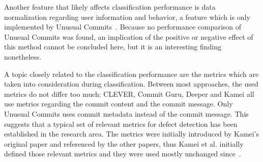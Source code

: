 Another feature that likely affects classification performance is data normalization regarding user information and behavior, a feature which is only implemented by Unusual Commits~\cite{Goyal2017}.
Because no performance comparison of Unusual Commits was found, an implication of the positive or negative effect of this method cannot be concluded here, but it is an interesting finding nonetheless.

A topic closely related to the classification performance are the metrics which are taken into consideration during classification. Between most approaches, the used metrics do not differ too much: CLEVER, Commit Guru, Deeper and Kamei all use metrics regarding the commit content and the commit message. Only Unusual Commits uses commit metadata instead of the commit message. This suggests that a typical set of relevant metrics for defect detection has been established in the research area. The metrics were initially introduced by Kamei's original paper and referenced by the other papers, thus Kamei et al. initially defined those relevant metrics and they were used mostly unchanged since~\cite{Kamei2013}.

